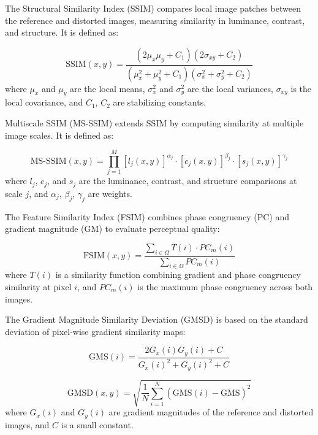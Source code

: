 The Structural Similarity Index (SSIM) compares local image patches between the reference and distorted images, measuring similarity in luminance, contrast, and structure. It is defined as:

\begin{equation}
\text{SSIM}(x, y) = \frac{(2\mu_x \mu_y + C_1)(2\sigma_{xy} + C_2)}{(\mu_x^2 + \mu_y^2 + C_1)(\sigma_x^2 + \sigma_y^2 + C_2)}
\end{equation}
where $\mu_x$ and $\mu_y$ are the local means, $\sigma_x^2$ and $\sigma_y^2$ are the local variances, $\sigma_{xy}$ is the local covariance, and $C_1$, $C_2$ are stabilizing constants.

Multiscale SSIM (MS-SSIM) extends SSIM by computing similarity at multiple image scales. It is defined as:

\begin{equation}
\text{MS-SSIM}(x, y) = \prod_{j=1}^{M} {[l_j(x, y)]}^{\alpha_j} \cdot {[c_j(x, y)]}^{\beta_j} \cdot {[s_j(x, y)]}^{\gamma_j}
\end{equation}
where $l_j$, $c_j$, and $s_j$ are the luminance, contrast, and structure comparisons at scale $j$, and $\alpha_j$, $\beta_j$, $\gamma_j$ are weights.

The Feature Similarity Index (FSIM) combines phase congruency (PC) and gradient magnitude (GM) to evaluate perceptual quality:

\begin{equation}
\text{FSIM}(x, y) = \frac{\sum_{i \in \Omega} T(i) \cdot PC_m(i)}{\sum_{i \in \Omega} PC_m(i)}
\end{equation}
where $T(i)$ is a similarity function combining gradient and phase congruency similarity at pixel $i$, and $PC_m(i)$ is the maximum phase congruency across both images.

The Gradient Magnitude Similarity Deviation (GMSD) is based on the standard deviation of pixel-wise gradient similarity maps:

\begin{equation}
\text{GMS}(i) = \frac{2G_x(i) G_y(i) + C}{{G_x(i)}^2 + {G_y(i)}^2 + C}
\end{equation}

\begin{equation}
\text{GMSD}(x, y) = \sqrt{\frac{1}{N} \sum_{i=1}^{N} {\left( \text{GMS}(i) - \overline{\text{GMS}} \right)}^2}
\end{equation}
where $G_x(i)$ and $G_y(i)$ are gradient magnitudes of the reference and distorted images, and $C$ is a small constant.

